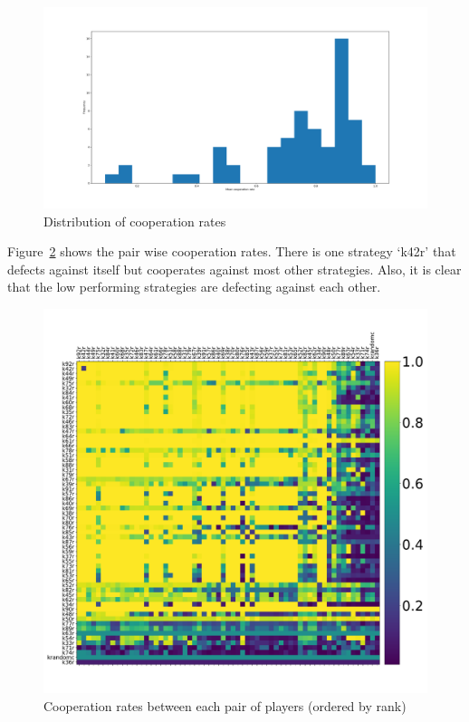 \documentclass{article}
\begin{document}
\begin{figure}[!hbtp]
    \centering
    \includegraphics[width=.8\textwidth]{assets/original_tournament_cooperation_rates.pdf}
    \caption{Distribution of cooperation rates}
    \label{fig:original_tournament_cooperation_rates}
\end{figure}

Figure~\ref{fig:original_tournament_pairwise_cooperation_rates} shows the pair wise
cooperation rates. There is one strategy `k42r' that defects against itself but
cooperates against most other strategies. Also, it is clear that the low
performing strategies are defecting against each other.

\begin{figure}[!hbtp]
    \centering
    \includegraphics[width=.8\textwidth]{assets/original_tournament_pairwise_cooperation_rates.pdf}
    \caption{Cooperation rates between each pair of players (ordered by rank)}
    \label{fig:original_tournament_pairwise_cooperation_rates}
\end{figure}
\end{document}
